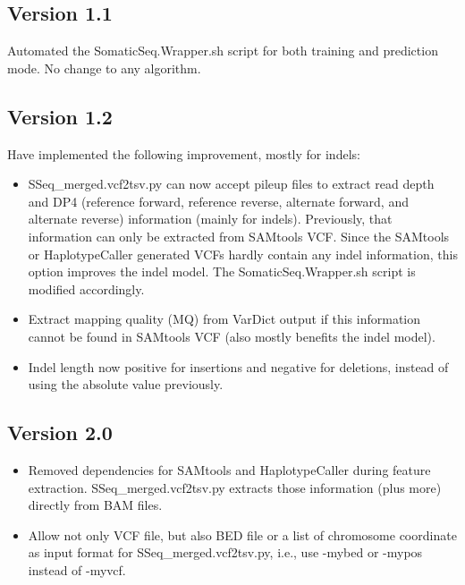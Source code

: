 \documentclass[10pt,letterpaper]{article}
\begin{document}
\begin{sloppypar}
\subsection{Version 1.1}
Automated the SomaticSeq.Wrapper.sh script for both training and prediction mode. No change to any algorithm. 

\subsection{Version 1.2}
Have implemented the following improvement, mostly for indels:

\begin{itemize}
 
  \item 
  SSeq\_merged.vcf2tsv.py can now accept pileup files to extract read depth and DP4 (reference forward, reference reverse, alternate forward, and alternate reverse) information (mainly for indels). Previously, that information can only be extracted from SAMtools VCF. Since the SAMtools or HaplotypeCaller generated VCFs hardly contain any indel information, this option improves the indel model. The SomaticSeq.Wrapper.sh script is modified accordingly.
 
  \item
  Extract mapping quality (MQ) from VarDict output if this information cannot be found in SAMtools VCF (also mostly benefits the indel model). 
 
  \item
  Indel length now positive for insertions and negative for deletions, instead of using the absolute value previously. 
 
 
\end{itemize}




\subsection{Version 2.0}

\begin{itemize}
  \item
  Removed dependencies for SAMtools and HaplotypeCaller during feature extraction. SSeq\_merged.vcf2tsv.py extracts those information (plus more) directly from BAM files.

  \item
  Allow not only VCF file, but also BED file or a list of chromosome coordinate as input format for SSeq\_merged.vcf2tsv.py, i.e., use -mybed or -mypos instead of -myvcf. 


\end{itemize}
\end{sloppypar}
\end{document}
